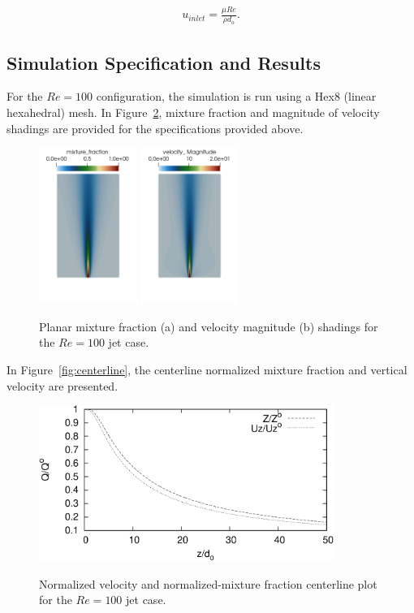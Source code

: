 \documentclass{article}
\begin{document}
\begin{align}
  u_{inlet} = \frac{\mu Re}{\rho d_o}.
\label{eq:muForm}
\end{align}

\subsection{Simulation Specification and Results}

For the $Re = 100$ configuration, the simulation is run using a Hex8 (linear hexahedral)
mesh. In Figure~\ref{fig:results}, mixture fraction and magnitude of velocity shadings 
are provided for the specifications provided above.

\begin{figure}[!htbp]
 \subfloat[]
  \centering
  {
   \includegraphics[height=2.0in]{images/3d_hex8_open_jet_mix_frac.png}
  }
  \subfloat[]
  \centering
  {
   \includegraphics[height=2.0in]{images/3d_hex8_open_jet_umag.png}
  }
  \caption{Planar mixture fraction (a) and velocity magnitude (b) shadings for the $Re = 100$ jet case.}
  \label{fig:results}
\end{figure}

In Figure~\ref{fig:centerline}, the centerline normalized mixture fraction and vertical velocity
are presented.

\begin{figure}[!htbp]
  \centering
  {
   \includegraphics[height=2.0in]{images/CenterlineData-crop.pdf}
  }
  \caption{Normalized velocity and normalized-mixture fraction centerline plot for the $Re = 100$ jet case.}
  \label{fig:results}
\end{figure}
\end{document}
